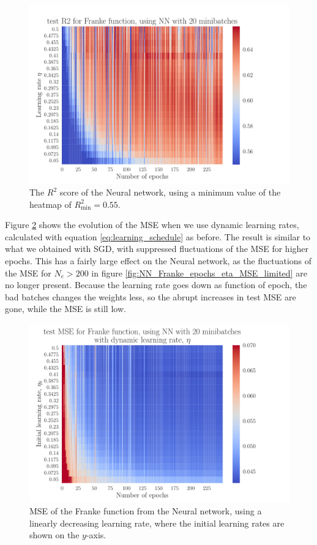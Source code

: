 \documentclass[12pt]{extarticle}
\begin{document}
\begin{figure}[h!]
	\includegraphics[width=\linewidth]{NN_Franke/NN_Franke__epochs_eta__test_R2__190748.pdf}
	\caption{The $R^2$ score of the Neural network, using a minimum value of the heatmap of $R^2_\mathrm{min}=0.55$.}
	\label{fig:NN_Franke_epochs_eta_R2}
\end{figure}

Figure \ref{fig:NN_Franke_epochs_dynamic_eta} shows the evolution of the MSE when we use dynamic learning rates, calculated with equation \eqref{eq:learning_schedule} as before. The result is similar to what we obtained with SGD, with suppressed fluctuations of the MSE for higher epochs. This has a fairly large effect on the Neural network, as the fluctuations of the MSE for $N_e>200$ in figure \ref{fig:NN_Franke_epochs_eta_MSE_limited} are no longer present. Because the learning rate goes down as function of epoch, the bad batches changes the weights less, so the abrupt increases in test MSE are gone, while the MSE is still low.

\begin{figure}[h!]
	\includegraphics[width=\linewidth]{NN_Franke/NN_Franke__epochs_dynamic_eta__test_MSE__489375.pdf}
	\caption{MSE of the Franke function from the Neural network, using a linearly decreasing learning rate, where the initial learning rates are shown on the $y$-axis.}
	\label{fig:NN_Franke_epochs_dynamic_eta}
\end{figure}
\end{document}
